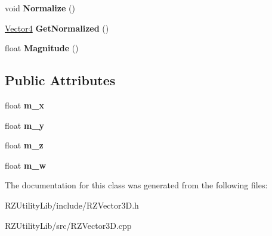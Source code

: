 \begin{DoxyCompactItemize}
\item 
\hypertarget{classrcz_engine_1_1_vector4_adfbe438574442dfb1f08663f44e64863}{}void {\bfseries Normalize} ()\label{classrcz_engine_1_1_vector4_adfbe438574442dfb1f08663f44e64863}

\item 
\hypertarget{classrcz_engine_1_1_vector4_a1b52bbefb42b3e1df852cbebb20c1402}{}\hyperlink{classrcz_engine_1_1_vector4}{Vector4} {\bfseries Get\+Normalized} ()\label{classrcz_engine_1_1_vector4_a1b52bbefb42b3e1df852cbebb20c1402}

\item 
\hypertarget{classrcz_engine_1_1_vector4_a84a201791a9cf7a13a3fbd35b0457d56}{}float {\bfseries Magnitude} ()\label{classrcz_engine_1_1_vector4_a84a201791a9cf7a13a3fbd35b0457d56}

\end{DoxyCompactItemize}
\subsection*{Public Attributes}
\begin{DoxyCompactItemize}
\item 
\hypertarget{classrcz_engine_1_1_vector4_a4adca94d4c654cb8fa46bb9db27e8c13}{}float {\bfseries m\+\_\+x}\label{classrcz_engine_1_1_vector4_a4adca94d4c654cb8fa46bb9db27e8c13}

\item 
\hypertarget{classrcz_engine_1_1_vector4_a1de56bd962975a04e99f5c1a6b7ea942}{}float {\bfseries m\+\_\+y}\label{classrcz_engine_1_1_vector4_a1de56bd962975a04e99f5c1a6b7ea942}

\item 
\hypertarget{classrcz_engine_1_1_vector4_a47002b6151318ea783d0350a93aaa4d5}{}float {\bfseries m\+\_\+z}\label{classrcz_engine_1_1_vector4_a47002b6151318ea783d0350a93aaa4d5}

\item 
\hypertarget{classrcz_engine_1_1_vector4_a5051af3b84205677f97c5c198c81fb96}{}float {\bfseries m\+\_\+w}\label{classrcz_engine_1_1_vector4_a5051af3b84205677f97c5c198c81fb96}

\end{DoxyCompactItemize}


The documentation for this class was generated from the following files\+:\begin{DoxyCompactItemize}
\item 
R\+Z\+Utility\+Lib/include/R\+Z\+Vector3\+D.\+h\item 
R\+Z\+Utility\+Lib/src/R\+Z\+Vector3\+D.\+cpp\end{DoxyCompactItemize}
